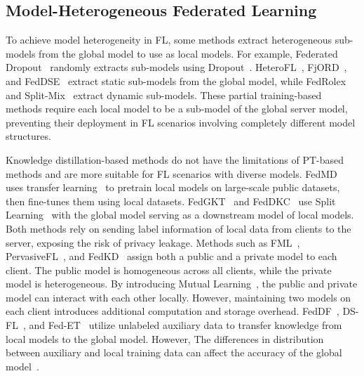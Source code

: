 \subsection{Model-Heterogeneous Federated Learning}

To achieve model heterogeneity in FL, some methods extract heterogeneous sub-models from the global model to use as local models. For example, Federated Dropout~\cite{caldas2018expanding} randomly extracts sub-models using Dropout~\cite{srivastava2014dropout}. 
HeteroFL~\cite{diao2020heterofl}, FjORD~\cite{horvath2021fjord}, and FedDSE~\cite{wang2024feddse} extract static sub-models from the global model, while FedRolex~\cite{alam2022fedrolex} and Split-Mix~\cite{hong2022efficient} extract dynamic sub-models. These partial training-based methods require each local model to be a sub-model of the global server model, preventing their deployment in FL scenarios involving completely different model structures.

Knowledge distillation-based methods do not have the limitations of PT-based methods and are more suitable for FL scenarios with diverse models. FedMD~\cite{li2019fedmd} uses transfer learning~\cite{liang2020we} to pretrain local models on large-scale public datasets, then fine-tunes them using local datasets. FedGKT~\cite{he2020group} and FedDKC~\cite{wu2024exploring} use Split Learning~\cite{gupta2018distributed} with the global model serving as a downstream model of local models. Both methods rely on sending label information of local data from clients to the server, exposing the risk of privacy leakage. Methods such as FML~\cite{shen2023federated}, PervasiveFL~\cite{xia2022pervasivefl}, and FedKD~\cite{wu2022communication} assign both a public and a private model to each client. The public model is homogeneous across all clients, while the private model is heterogeneous. By introducing Mutual Learning~\cite{zhang2018deep}, the public and private model can interact with each other locally. However, maintaining two models on each client introduces additional computation and storage overhead.
FedDF~\cite{lin2020ensemble}, DS-FL~\cite{itahara2021distillation}, and Fed-ET~\cite{ijcai2022p399} utilize unlabeled auxiliary data to transfer knowledge from local models to the global model. However, The differences in distribution between auxiliary and local training data can affect the accuracy of the global model~\cite{stanton2021does}.

